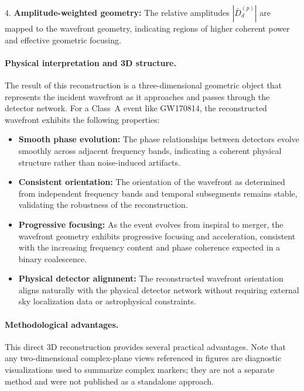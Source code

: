 \documentclass[11pt,a4paper]{article}
\begin{document}
4. \textbf{Amplitude-weighted geometry:} The relative amplitudes $|\bar{D}_d^{(p)}|$ are
mapped to the wavefront geometry, indicating regions of higher coherent power and
effective geometric focusing.

\paragraph{Physical interpretation and 3D structure.}
The result of this reconstruction is a three-dimensional geometric object that represents
the incident wavefront as it approaches and passes through the detector network.
For a Class~A event like GW170814, the reconstructed wavefront exhibits the following
properties:

\begin{itemize}
\item \textbf{Smooth phase evolution:} The phase relationships between detectors evolve
smoothly across adjacent frequency bands, indicating a coherent physical structure rather
than noise-induced artifacts.

\item \textbf{Consistent orientation:} The orientation of the wavefront as determined
from independent frequency bands and temporal subsegments remains stable, validating the
robustness of the reconstruction.

\item \textbf{Progressive focusing:} As the event evolves from inspiral to merger, the
wavefront geometry exhibits progressive focusing and acceleration, consistent with the
increasing frequency content and phase coherence expected in a binary coalescence.

\item \textbf{Physical detector alignment:} The reconstructed wavefront orientation
aligns naturally with the physical detector network without requiring external sky
localization data or astrophysical constraints.
\end{itemize}

\paragraph{Methodological advantages.}
This direct 3D reconstruction provides several practical advantages. Note that any
two-dimensional complex-plane views referenced in figures are diagnostic visualizations
used to summarize complex markers; they are not a separate method and were not published
as a standalone approach.
\end{document}
